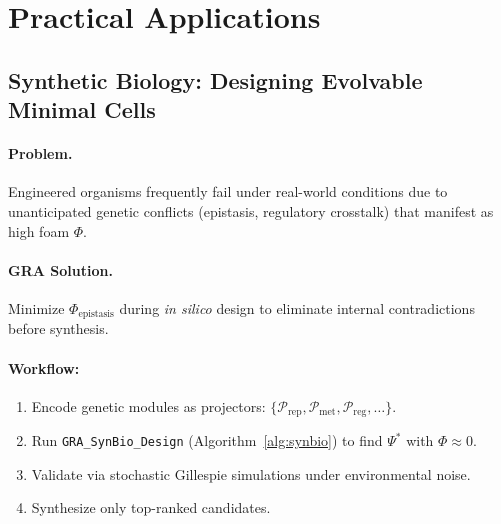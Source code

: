 \documentclass[11pt,a4paper]{article}
\theoremstyle{plain}
\theoremstyle{definition}
\theoremstyle{remark}
\newcommand{\Foam}{\Phi}
\newcommand{\Projector}{\mathcal{P}}
\begin{document}
\section{Practical Applications}
\label{sec:applications}

\subsection{Synthetic Biology: Designing Evolvable Minimal Cells}

\paragraph{Problem.} Engineered organisms frequently fail under real-world conditions due to unanticipated genetic conflicts (epistasis, regulatory crosstalk) that manifest as high foam $\Foam$.

\paragraph{GRA Solution.} Minimize $\Foam_{\text{epistasis}}$ during \textit{in silico} design to eliminate internal contradictions before synthesis.

\paragraph{Workflow:}
\begin{enumerate}
    \item Encode genetic modules as projectors: $\{\Projector_{\text{rep}}, \Projector_{\text{met}}, \Projector_{\text{reg}}, \dots\}$.
    \item Run \texttt{GRA\_SynBio\_Design} (Algorithm~\ref{alg:synbio}) to find $\Psi^*$ with $\Foam \approx 0$.
    \item Validate via stochastic Gillespie simulations under environmental noise.
    \item Synthesize only top-ranked candidates.
\end{enumerate}
\end{document}
